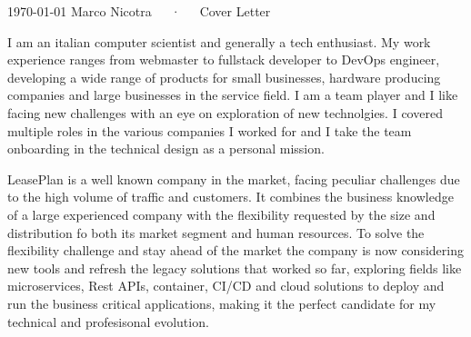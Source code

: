 \documentclass[11pt, a4paper]{awesome-cv}
\begin{document}
\makecvheader[R]

\makecvfooter
  {\today}
  {Marco Nicotra~~~·~~~Cover Letter}
  {}

\makelettertitle

\begin{cvletter}

I am an italian computer scientist and generally a tech enthusiast. My work experience ranges from webmaster to fullstack developer to DevOps engineer, developing a wide range of products for small businesses, hardware producing companies and large businesses in the service field. I am a team player and I like facing new challenges with an eye on exploration of new technolgies. I covered multiple roles in the various companies I worked for and I take the team onboarding in the technical design as a personal mission.

LeasePlan is a well known company in the market, facing peculiar challenges due to the high volume of traffic and customers. It combines the business knowledge of a large experienced company with the flexibility requested by the size and distribution fo both its market segment and human resources. To solve the flexibility challenge and stay ahead of the market the company is now considering new tools and refresh the legacy solutions that worked so far, exploring fields like microservices, Rest APIs, container, CI/CD and cloud solutions to deploy and run the business critical applications, making it the perfect candidate for my technical and profesisonal evolution.



\end{cvletter}
\end{document}
